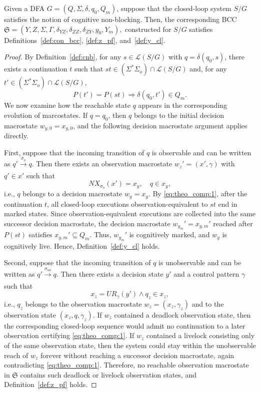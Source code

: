 \documentclass[final,5p,times,twocolumn,authoryear]{elsarticle}
\begin{document}
\begin{theorem}\label{theo:cnb_complete}
Given a DFA $G = (Q, \Sigma, \delta, q_0, Q_m)$, suppose that the closed-loop system $S / G$ satisfies the notion of cognitive non-blocking.
Then, the corresponding BCC
$
\mathfrak{S} = (Y, Z, \Sigma, \Gamma, \delta_{YZ}, \delta_{ZZ}, \delta_{ZY}, y_0, Y_m),
$
constructed for $S / G$ satisfies Definitions~\ref{def:con_bcc},
\ref{def:z_pf}, and~\ref{def:y_cl}.
\end{theorem}

\begin{proof}
By Definition~\ref{def:cnb}, for any $s \in \mathcal{L}(S / G)$ with $q = \delta(q_0, s)$, there exists a continuation $t$ such that $st \in (\Sigma^*\Sigma_o) \cap \mathcal{L}(S / G)$ and, for any $t' \in (\Sigma^*\Sigma_o) \cap \mathcal{L}(S / G)$,
\begin{equation}\label{eq:theo_comp:1}
    P(t') = P(st) \Rightarrow \delta(q_0, t') \in Q_m.
\end{equation}
%
We now examine how the reachable state $q$ appears in the corresponding evolution of marcostates. 
If $q = q_0$, then $q$ belongs to the initial decision macrostate $w_{y,0} = x_{y,0}$, and the following decision macrostate argument applies directly.

First, suppose that the incoming transition of $q$ is observable and can be written as $q' \xrightarrow[]{\sigma_o} q$. 
Then there exists an observation macrostate $w_z' = (x', \gamma)$ with $q' \in x'$ such that
$$
NX_{\sigma_o}(x') = x_y, \quad q \in x_y,
$$
i.e., $q$ belongs to a decision macrostate $w_y = x_y$.
%
By \eqref{eq:theo_comp:1}, after the continuation $t$, all closed-loop executions observation-equivalent to $st$ end in marked states. 
Since observation-equivalent executions are collected into the same successor decision macrostate, the decision macrostate $w_{y_m}' = x_{y,m}'$ reached after $P(st)$ satisfies
$
x_{y,m}' \subseteq Q_m.
$
Thus, $w_{y_m}'$ is cognitively marked, and $w_y$ is cognitively live.
Hence, Definition~\ref{def:y_cl} holds.

Second, suppose that the incoming transition of $q$ is unobservable and can be written as $q' \xrightarrow[]{\sigma_{uo}} q$. Then there exists a decision state $y'$ and a control pattern $\gamma$ such that
$$
x_z = UR_{\gamma}(y') \wedge q_z \in x_z,
$$
i.e., $q_z$ belongs to the observation macrostate $w_z = (x_z, \gamma_z)$ and to the observation state $(x_z, q, \gamma_z)$.
%
If $w_z$ contained a deadlock observation state, then the corresponding closed-loop sequence would admit no continuation to a later observation certifying \eqref{eq:theo_comp:1}. 
If $w_z$ contained a livelock consisting only of the same observation state, then the system could stay within the unobservable reach of $w_z$ forever without reaching a successor decision macrostate, again contradicting \eqref{eq:theo_comp:1}. 
Therefore, no reachable observation macrostate in $\mathfrak{S}$ contains such deadlock or livelock observation states, and Definition~\ref{def:z_pf} holds.


\end{proof}
\end{document}
